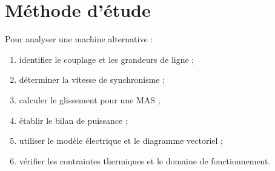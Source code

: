 \section{Méthode d'étude}
Pour analyser une machine alternative :
\begin{enumerate}
\item identifier le couplage et les grandeurs de ligne ;
\item déterminer la vitesse de synchronisme ;
\item calculer le glissement pour une MAS ;
\item établir le bilan de puissance ;
\item utiliser le modèle électrique et le diagramme vectoriel ;
\item vérifier les contraintes thermiques et le domaine de fonctionnement.
\end{enumerate}
